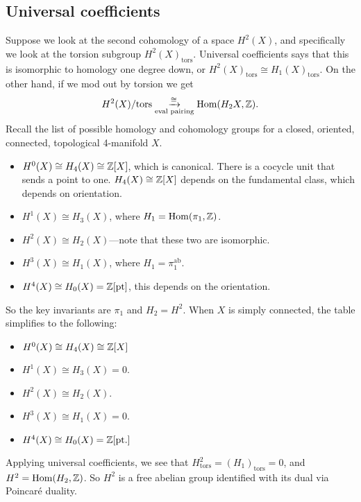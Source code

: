 \subsection{Universal coefficients}
Suppose we look at the second cohomology of a space $H^2(X)$, and specifically we look at the torsion subgroup $H^2(X) _{\mathrm{tors}}$. Universal coefficients says that this is isomorphic to homology one degree down, or $H^2(X) _{\mathrm{tors}} \cong H_1(X) _{\mathrm{tors}}$. On the other hand, if we mod out by torsion we get \[
    H^2(X) / \mathrm{tors} \underset{\text{eval pairing} }{\xrightarrow{\cong}} \operatorname{Hom} (H_2 X, \mathbb{Z}).
\]  Recall the list of possible homology and cohomology groups for a closed, oriented, connected, topological 4-manifold $X$.
\begin{itemize}
\setlength\itemsep{-.2em}
    \item $H^0(X) \cong H_4(X) \cong \mathbb{Z} [X]$, which is canonical. There is a cocycle unit that sends a point to one. $H_4(X) \cong \mathbb{Z}[X]$ depends on the fundamental class, which depends on orientation.
    \item $H^1(X) \cong H_3(X)$, where $H_1=\operatorname{Hom}(\pi_1, \mathbb{Z})$.
    \item $H^2(X) \cong H_2(X)$---note that these two are isomorphic. 
    \item $H^3(X) \cong H_1(X)$, where $H_1 = \pi_1 ^{\mathrm{ab}}$.
    \item $H^4(X) \cong H_0(X) = \mathbb{Z} [ \text{pt}] $, this depends on the orientation.
\end{itemize}
So the key invariants are $\pi_1$ and $H_2 = H^2$. When $X$ is simply connected, the table simplifies to the following:
\begin{itemize}
\setlength\itemsep{-.2em}
    \item $H^0(X) \cong H_4(X) \cong \mathbb{Z} [X]$
    \item $H^1(X) \cong H_3(X) = 0$.
    \item $H^2(X) \cong H_2(X)$.
    \item $H^3(X) \cong H_1(X) = 0$.
    \item $H^4(X) \cong H_0(X) = \mathbb{Z} [ \text{pt.}] $
\end{itemize} Applying universal coefficients, we see that $H^2 _{\mathrm{tors}} = (H_1) _{\mathrm{tors}}=0$, and $H^2 = \operatorname{Hom}(H_2, \mathbb{Z})$. So $H^2 $ is a free abelian group identified with its dual via Poincar\'e duality.
